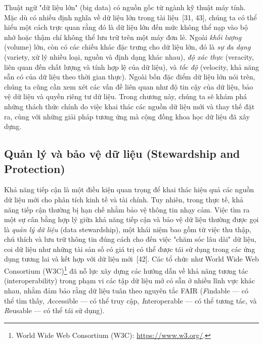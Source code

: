 Thuật ngữ "dữ liệu lớn" (big data) có nguồn gốc từ ngành kỹ thuật máy tính. Mặc dù có nhiều định nghĩa về dữ liệu lớn trong tài liệu~[31, 43], chúng ta có thể hiểu một cách trực quan rằng đó là dữ liệu lớn đến mức không thể nạp vào bộ nhớ hoặc thậm chí không thể lưu trữ trên một máy đơn lẻ. Ngoài \emph{khối lượng} (volume) lớn, còn có các chiều khác đặc trưng cho dữ liệu lớn, đó là \emph{sự đa dạng} (variety, xử lý nhiều loại, nguồn và định dạng khác nhau), \emph{độ xác thực} (veracity, liên quan đến chất lượng và tính hợp lệ của dữ liệu), và \emph{tốc độ} (velocity, khả năng sẵn có của dữ liệu theo thời gian thực). Ngoài bốn đặc điểm dữ liệu lớn nói trên, chúng ta cũng cần xem xét các vấn đề liên quan như độ tin cậy của dữ liệu, bảo vệ dữ liệu và quyền riêng tư dữ liệu. Trong chương này, chúng ta sẽ khám phá những thách thức chính do việc khai thác các nguồn dữ liệu mới và thay thế đặt ra, cùng với những giải pháp tương ứng mà cộng đồng khoa học dữ liệu đã xây dựng.

\subsection{Quản lý và bảo vệ dữ liệu (Stewardship and Protection)}

Khả năng tiếp cận là một điều kiện quan trọng để khai thác hiệu quả các nguồn dữ liệu mới cho phân tích kinh tế và tài chính. Tuy nhiên, trong thực tế, khả năng tiếp cận thường bị hạn chế nhằm bảo vệ thông tin nhạy cảm. Việc tìm ra một sự cân bằng hợp lý giữa khả năng tiếp cận và bảo vệ dữ liệu thường được gọi là \emph{quản lý dữ liệu} (data stewardship), một khái niệm bao gồm từ việc thu thập, chú thích và lưu trữ thông tin đúng cách cho đến việc "chăm sóc lâu dài" dữ liệu, coi dữ liệu như những tài sản số có giá trị có thể được tái sử dụng trong các ứng dụng tương lai và kết hợp với dữ liệu mới~[42]. Các tổ chức như World Wide Web Consortium (W3C)\footnote{World Wide Web Consortium (W3C): \url{https://www.w3.org/}.} đã nỗ lực xây dựng các hướng dẫn về khả năng tương tác (interoperability) trong phạm vi các tập dữ liệu mở có sẵn ở nhiều lĩnh vực khác nhau, nhằm đảm bảo rằng dữ liệu tuân theo nguyên tắc FAIR (\emph{F}indable — có thể tìm thấy, \emph{A}ccessible — có thể truy cập, \emph{I}nteroperable — có thể tương tác, và \emph{R}eusable — có thể tái sử dụng).

